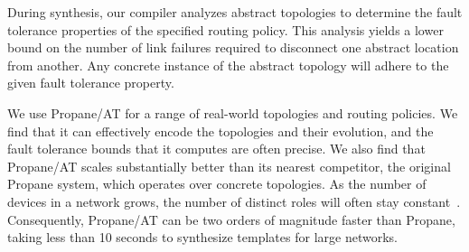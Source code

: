 \documentclass[numbers, 10pt]{sigplanconf}
\newcommand{\sysname}{{\text{}\small \sf Propane/AT}\xspace}
\newcommand{\Propane}{{\text{}\small \sf Propane}\xspace}
\begin{document}
During synthesis, our compiler analyzes abstract topologies to determine
the fault tolerance properties of the specified routing policy.  This analysis yields a lower  
bound on the number of link failures required to disconnect one abstract location from another. 
Any concrete instance of the abstract topology will adhere to the given fault tolerance property.




We use \sysname for a range of real-world topologies and routing policies. We find that it can effectively encode the topologies and their evolution, and the fault tolerance bounds that it computes are often precise. 
We also find that \sysname scales substantially better than its nearest competitor, the original \Propane system, 
which operates over concrete topologies. As the number of devices in a
network grows, the number of distinct roles will often stay constant~\cite{surgery}.
Consequently, \sysname can be two orders of magnitude
faster than \Propane, taking less than 10 seconds to synthesize templates for large  networks.
\end{document}
